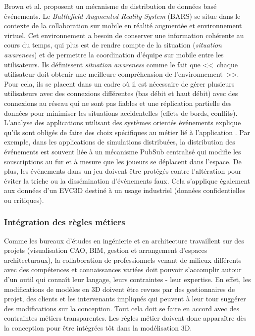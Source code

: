 Brown et al. \cite{Brown2003} proposent un mécanisme de distribution de 
données basé événements. Le \textit{Battlefield Augmented Reality System} 
(BARS) se situe dans le contexte de la collaboration sur mobile en réalité 
augmentée et environnement virtuel. Cet environnement a besoin de conserver 
une information cohérente au cours du temps, qui plus est de rendre compte de la 
situation (\textit{situation awareness}) et de permettre la coordination d'équipe sur 
mobile entre les utilisateurs. Ils définissent \textit{situation awareness} comme le 
fait que <<~chaque utilisateur doit obtenir une meilleure compréhension de 
l'environnement~>>. Pour cela, ils se placent dans un cadre où il est nécessaire 
de gérer plusieurs utilisateurs avec des connexions différentes (bas débit et haut 
débit) avec des connexions au réseau qui ne sont pas fiables et une réplication 
partielle des données pour minimiser les situations accidentelles 
(effets de bords, conflits). L'analyse des applications utilisant des 
systèmes orientés événements explique qu'ils sont obligés de faire des choix 
spécifiques au métier lié à l'application 
\cite{Hinze2009}. Par exemple, dans les applications de simulations distribuées, 
la distribution des événements est souvent liée à un mécanisme \gls{PubSub} centralisé qui 
modifie les souscriptions au fur et à mesure que les joueurs se déplacent dans 
l'espace. De plus, les événements dans un jeu doivent être protégés contre 
l'altération pour éviter la triche ou la dissémination d'événements faux. Cela 
s'applique également aux données d'un \gls{EVC3D} destiné à un usage industriel 
(données confidentielles ou critiques).

\subsubsection{Intégration des règles métiers}
Comme les bureaux d'études en ingénierie et en architecture travaillent sur des 
projets (visualisation \gls{CAO}, \gls{BIM}, gestion et arrangement d'espaces 
architecturaux), la collaboration de professionnels venant de milieux différents 
avec des compétences et connaissances variées doit pouvoir s'accomplir autour d'un 
outil qui connaît leur langage, leurs contraintes - leur expertise. En effet, les 
modifications de modèles en \gls{3D} doivent être revues par des gestionnaires de 
projet, des clients et les intervenants impliqués qui peuvent à leur tour suggérer 
des modifications sur la conception. Tout cela doit se faire en accord avec des 
contraintes métiers transparentes.
Les règles métier doivent donc apparaître dès la conception pour être 
intégrées tôt dans la modélisation \gls{3D}. 

